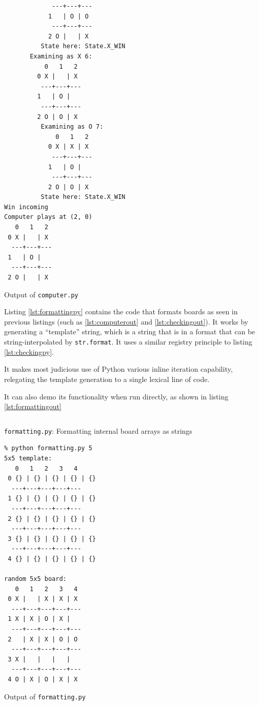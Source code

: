 \documentclass[a4paper,11pt]{article}
\newenvironment{longlisting}
{\addvspace{\baselineskip}\captionsetup{type=listing}}
{\addvspace{\baselineskip}}
\begin{document}
\begin{longlisting}
\begin{verbatim}
             ---+---+---
            1   | O | O 
             ---+---+---
            2 O |   | X 
          State here: State.X_WIN
       Examining as X 6:
           0   1   2
         0 X |   | X 
          ---+---+---
         1   | O |   
          ---+---+---
         2 O | O | X 
          Examining as O 7:
              0   1   2
            0 X | X | X 
             ---+---+---
            1   | O |   
             ---+---+---
            2 O | O | X 
          State here: State.X_WIN
Win incoming
Computer plays at (2, 0)
   0   1   2
 0 X |   | X 
  ---+---+---
 1   | O |   
  ---+---+---
 2 O |   | X 
\end{verbatim}
\caption{Output of \texttt{computer.py}}\label{lst:computerout}
\end{longlisting}

    Listing \ref{lst:formattingpy} contains the code that formats boards as seen
    in previous listings (such as \ref{lst:computerout} and
    \ref{lst:checkingout}). It works by generating a ``template'' string, which
    is a string that is in a format that can be string-interpolated by
    \texttt{str.format}. It uses a similar registry principle to listing
    \ref{lst:checkingpy}.

    It makes most judicious use of Python various inline iteration capability,
    relegating the template generation to a single lexical line of code.

    It can also demo its functionality when run directly, as shown in listing
    \ref{lst:formattingout}

\begin{longlisting}
\inputminted{python}{../src/formatting.py}
\caption{\texttt{formatting.py}: Formatting internal board arrays as strings}
\label{lst:formattingpy}
\end{longlisting}

\begin{longlisting}
\begin{verbatim}
% python formatting.py 5
5x5 template:
   0   1   2   3   4
 0 {} | {} | {} | {} | {}
  ---+---+---+---+---
 1 {} | {} | {} | {} | {}
  ---+---+---+---+---
 2 {} | {} | {} | {} | {}
  ---+---+---+---+---
 3 {} | {} | {} | {} | {}
  ---+---+---+---+---
 4 {} | {} | {} | {} | {}

random 5x5 board:
   0   1   2   3   4
 0 X |   | X | X | X
  ---+---+---+---+---
 1 X | X | O | X |
  ---+---+---+---+---
 2   | X | X | O | O
  ---+---+---+---+---
 3 X |   |   |   |
  ---+---+---+---+---
 4 O | X | O | X | X
\end{verbatim}
\caption{Output of \texttt{formatting.py}}\label{lst:formattingout}
\end{longlisting}
\end{document}
